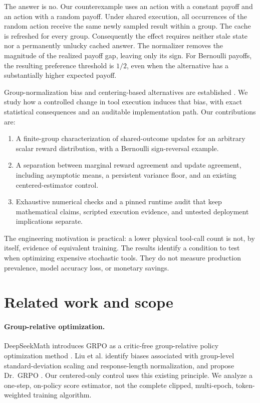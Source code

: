 \documentclass[10pt,letterpaper]{article}
\begin{document}
The answer is no. Our counterexample uses an action with a constant payoff and
an action with a random payoff. Under shared execution, all occurrences of the
random action receive the same newly sampled result within a group. The cache
is refreshed for every group. Consequently the effect requires neither stale
state nor a permanently unlucky cached answer. The normalizer removes the
magnitude of the realized payoff gap, leaving only its sign. For Bernoulli
payoffs, the resulting preference threshold is $1/2$, even when the alternative
has a substantially higher expected payoff.

Group-normalization bias and centering-based alternatives are established
\cite{drgrpo,che}. We study how a controlled change in tool execution induces
that bias, with exact statistical consequences and an auditable implementation
path. Our contributions are:
\begin{enumerate}
\item A finite-group characterization of shared-outcome updates for an arbitrary
scalar reward distribution, with a Bernoulli sign-reversal example.
\item A separation between marginal reward agreement and update agreement,
including asymptotic means, a persistent variance floor, and an existing
centered-estimator control.
\item Exhaustive numerical checks and a pinned runtime audit that keep
mathematical claims, scripted execution evidence, and untested deployment
implications separate.
\end{enumerate}

The engineering motivation is practical: a lower physical tool-call count is
not, by itself, evidence of equivalent training. The results identify a
condition to test when optimizing expensive stochastic tools. They do not
measure production prevalence, model accuracy loss, or monetary savings.

\section{Related work and scope}
\paragraph{Group-relative optimization.}
DeepSeekMath introduces GRPO as a critic-free group-relative policy optimization
method \cite{deepseekmath}. Liu et al. identify biases associated with
group-level standard-deviation scaling and response-length normalization, and
propose Dr.\ GRPO \cite{drgrpo}. Our centered-only control uses this existing
principle. We analyze a one-step, on-policy score estimator, not the complete
clipped, multi-epoch, token-weighted training algorithm.
\end{document}
